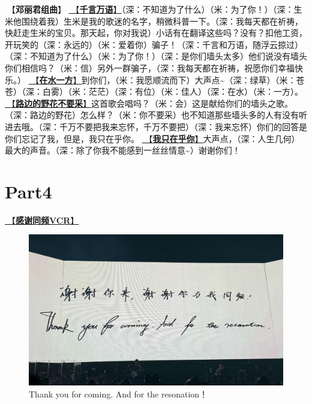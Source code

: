 \documentclass[]{ctexbook}
\begin{document}
🎵【\textbf{邓丽君组曲}】
\hyperref[thousands-of-words]{🎵【\textbf{千言万语}】}（深：不知道为了什么）（米：为了你！）（深：生米他围绕着我）生米是我的歌迷的名字，稍微科普一下。（深：我每天都在祈祷，快赶走生米的宝贝。那天起，你对我说）小话有在翻译这些吗？没有？扣他工资，开玩笑的（深：永远的）（米：爱着你）骗子！（深：千言和万语，随浮云掠过）（深：不知道为了什么）（米：为了你！）（深：是你们墙头太多）他们说没有墙头你们相信吗？（米：信）另外一群骗子，（深：我每天都在祈祷，祝愿你们幸福快乐。）
\hyperref[on-the-water-side]{🎵【\textbf{在水一方}】}到你们，（米：我愿顺流而下）大声点\textasciitilde（深：绿草）（米：苍苍）（深：白雾）（米：茫茫）（深：有位）（米：佳人）（深：在水）（米：一方）。
\hyperref[only-with-me]{🎵【\textbf{路边的野花不要采}】}这首歌会唱吗？（米：会）这是献给你们的墙头之歌。（深：路边的野花）怎么样？（米：你不要采）也不知道那些墙头多的人有没有听进去哦。（深：千万不要把我来忘怀，千万不要把）（深：我来忘怀）你们的回答是你们忘记了我，但是，我只在乎你。
\hyperref[only-you]{🎵【\textbf{我只在乎你}】}大声点，（深：人生几何）最大的声音。（深：除了你我不能感到一丝丝情意\textasciitilde）谢谢你们！

\section{Part4}\label{LasVegas-20250301-part4}

\hyperref[thank-you-vcr]{🎥【\textbf{感谢同频VCR}】}

\begin{figure}

{\centering \includegraphics[width=400pt]{img/lasvegas20250228/thankyou} 

}

\caption{Thank you for coming. And for the resonation！}\label{fig:unnamed-chunk-179}
\end{figure}
\end{document}
